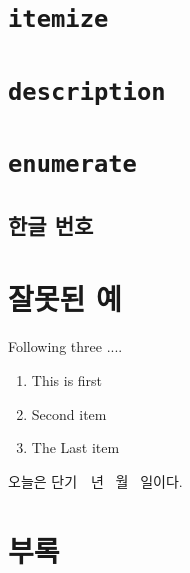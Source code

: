 \documentclass[11pt]{article}
\begin{document}
\tableofcontents

\section{\texttt{itemize}}
\section{\texttt{description}}
\section{\texttt{enumerate}}
\subsection{한글 번호}
\section{잘못된 예}

Following three ....
\begin{enumerate}
\item This is first
\item Second item
\item The Last item
\end{enumerate}

\setcounter{D@anki}{\year}
\addtocounter{D@anki}{2333}
\def\dankitoday{단기~~년 \number\month~월 \number\day~일}

오늘은 \dankitoday 이다.

\section*{부록}
\end{document}
